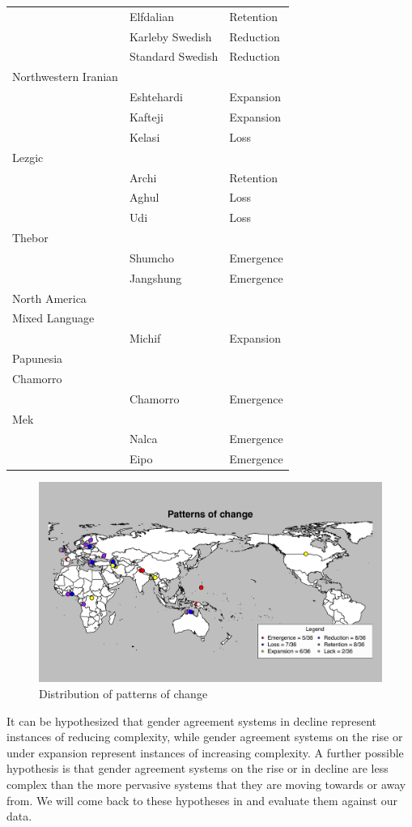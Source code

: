 \documentclass[output=collectionpaper]{langsci/langscibook}
\begin{document}
\begin{longtable}{lll}
&Elfdalian& Retention\\
&Karleby Swedish & Reduction\\
&Standard Swedish& Reduction\\
Northwestern Iranian && \\
& Eshtehardi& Expansion\\
&Kafteji& Expansion \\
&Kelasi&Loss \\
Lezgic &&\\
&Archi&  Retention \\
&Aghul& Loss\\
& Udi& Loss\\
Thebor &&\\
& Shumcho& Emergence\\
& Jangshung&Emergence\\
\midrule
North America&&\\
\midrule
Mixed Language &&\\
& Michif&Expansion\\
\midrule
Papunesia &&\\
\midrule
Chamorro && \\
&Chamorro& Emergence\\
Mek &&\\
&Nalca&Emergence\\
&Eipo&Emergence\\
\end{longtable}

\begin{figure}
\includegraphics[height=.4\textheight]{figures/11/Patterns_sample}
\caption{Distribution of patterns of change}
\label{fig:dgm:patterns}
\end{figure}
\newpage


It can be hypothesized that gender agreement systems in decline represent instances of reducing complexity, while gender agreement systems on the rise or under expansion represent instances of increasing complexity. A further possible hypothesis is that gender agreement systems on the rise or in decline are less complex than the more pervasive systems that they are moving towards or away from. We will come back to these hypotheses in  and evaluate them against our data.
\end{document}
